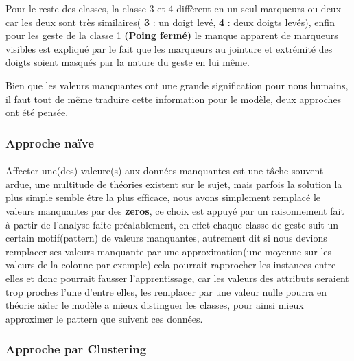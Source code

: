 Pour le reste des classes, la classe 3 et 4 diffèrent en un seul marqueurs ou deux car les deux sont très similaires( \textbf{3} : un doigt levé, \textbf{4} : deux doigts levés), enfin pour les geste de la classe 1 \textbf{(Poing fermé)} le manque apparent de marqueurs visibles est expliqué par le fait que les marqueurs au jointure et extrémité des doigts soient masqués par la nature du geste en lui même.\par 
Bien que les valeurs manquantes ont une grande signification pour nous humains, il faut tout de même traduire cette information pour le modèle, deux approches ont été pensée.
\subsubsection{Approche naïve}
\paragraph{}
Affecter une(des) valeure(s) aux données manquantes est une tâche souvent ardue, une multitude de théories existent sur le sujet, mais parfois la solution la plus simple semble être la plus efficace, nous avons simplement remplacé le valeurs manquantes par des \textbf{zeros}, ce choix est appuyé par un raisonnement fait à partir de l'analyse faite préalablement, en effet chaque classe de geste suit un certain motif(pattern) de valeurs manquantes, autrement dit si nous devions remplacer ses valeurs manquante par une approximation(une moyenne sur les valeurs de la colonne par exemple) cela pourrait rapprocher les instances entre elles et donc pourrait fausser l'apprentissage, car les valeurs des attributs seraient trop proches l'une d'entre elles, les remplacer par une valeur nulle pourra en théorie aider le modèle a mieux distinguer les classes, pour ainsi mieux approximer le pattern que suivent ces données.
\subsubsection{Approche par Clustering}
\paragraph{}